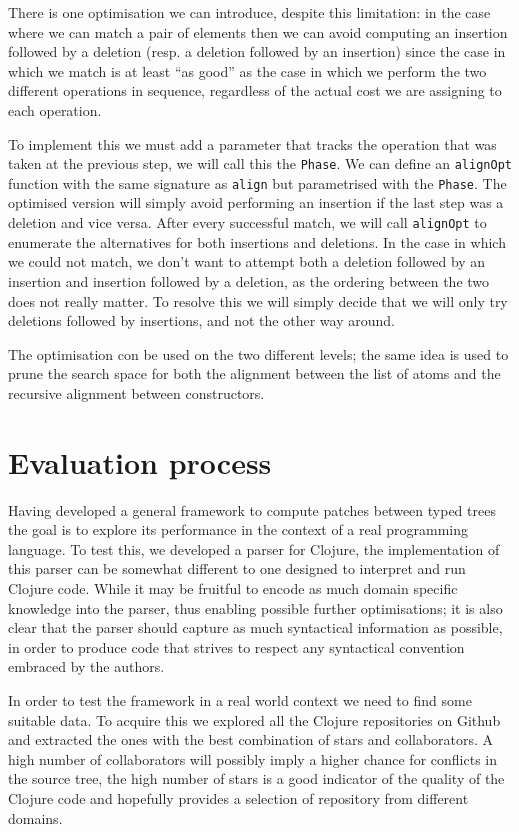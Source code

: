 \documentclass[11pt]{article}
\begin{document}
There is one optimisation we can introduce, despite this limitation: in
the case where we can match a pair of elements then we can avoid
computing an insertion followed by a deletion (resp. a deletion followed
by an insertion) since the case in which we match is at least ``as
good'' as the case in which we perform the two different operations in
sequence, regardless of the actual cost we are assigning to each
operation.

To implement this we must add a parameter that tracks the operation that
was taken at the previous step, we will call this the \texttt{Phase}. We
can define an \texttt{alignOpt} function with the same signature as
\texttt{align} but parametrised with the \texttt{Phase}. The optimised
version will simply avoid performing an insertion if the last step was a
deletion and vice versa. 
After every successful match, we will call \texttt{alignOpt} to enumerate the alternatives for both insertions and
deletions. In the case in which we could not match, we don't 
want to attempt both a deletion followed by an insertion and insertion followed by a deletion, as the 
ordering between the two does not really matter. To resolve this we will simply 
decide that we will only try deletions followed by insertions, and not the other 
way around.

The optimisation con be used on the two different levels; the same idea is used to prune the search space 
for both the alignment between the list of atoms and the recursive alignment between constructors.


\section{Evaluation process}

Having developed a general framework to compute patches between typed trees the 
goal is to explore its performance in the context of a real programming 
language.
To test this, we developed a parser for Clojure, the implementation of this parser can be somewhat 
different to one designed to interpret and run Clojure code. While it may 
be fruitful to encode as much domain specific knowledge into the parser, thus 
enabling possible further optimisations; it is also clear that the parser should 
capture as much syntactical information as possible, in order to produce code 
that strives to respect any syntactical convention embraced by the authors.

In order to test the framework in a real world context we need to find some suitable data. To acquire this 
we explored all the Clojure repositories on Github and extracted the ones with the best combination of 
stars and collaborators. A high number of collaborators will possibly imply a higher chance for conflicts in
the source tree, the high number of stars is a good indicator of the quality of 
the Clojure code and hopefully provides a selection of repository from different 
domains.
\end{document}
